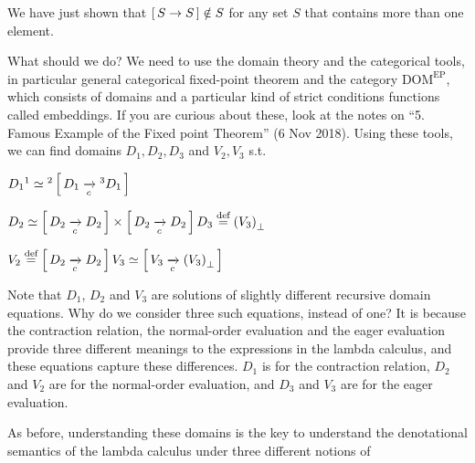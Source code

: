 \begin{enumcirc}
	We have just shown that $\left[ \, S \rightarrow S \, \right] \notin S$ for any set $S$
	that contains more than one element.
	\item
	What should we do?
	We need to use the domain theory and the categorical tools, in particular
	general categorical fixed-point theorem and the category
	$\textrm{DOM}^\textrm{EP}$, which consists of domains and a particular kind of
	strict conditions functions called embeddings.
	If you are curious about these, look at the notes on
	``5. Famous Example of the Fixed point Theorem'' (6 Nov 2018).
	Using these tools, we can find domains $D_1, D_2, D_3$ and $V_2, V_3$ s.t.
	\begin{enumrm}
		\item
		$
			D_1\footnotemark \simeq\footnotemark \brackets{D_1 \toc\footnotemark D_1}
		$
		\item
		$
			D_2 \simeq \left[ \, D_2 \xrightarrow[c]{} D_2 \, \right] \times \left[ \, D_2 \xrightarrow[c]{} D_2 \, \right] \\
			D_3 \stackrel{\text{def}}{=} \left( V_3 \right)_\bot                                       \\
		$
		\item
		$
			V_2 \stackrel{\text{def}}{=} \left[ \, D_2 \xrightarrow[c]{} D_2 \, \right]              \\
			V_3 \simeq \left[ \, V_3 \xrightarrow[c]{} \left( V_3 \right)_\bot \, \right] \\
		$
	\end{enumrm}
	\item
	Note that $D_1$, $D_2$ and $V_3$ are solutions of slightly different recursive
	domain equations.
	Why do we consider three such equations, instead of one?
	It is because the contraction relation, the normal-order evaluation and the
	eager evaluation provide three different meanings to the expressions in the
	lambda calculus,
	and these equations capture these differences.
	$D_1$ is for the contraction relation, $D_2$ and $V_2$ are for the normal-order
	evaluation, and $D_3$ and $V_3$ are for the eager evaluation.
	\item
	As before, understanding these domains is the key to understand the
	denotational semantics of the lambda calculus under three different notions of

\end{enumcirc}
